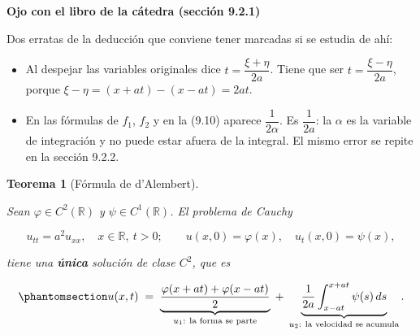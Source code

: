 \documentclass[
  spanish,
  a4paper,
]{scrbook}
\providecommand{\tightlist}{%
  \setlength{\itemsep}{0pt}\setlength{\parskip}{0pt}}
\theoremstyle{definition}
\theoremstyle{plain}
\theoremstyle{definition}
\theoremstyle{plain}
\newtheorem{theorem}{Teorema}[chapter]
\theoremstyle{definition}
\theoremstyle{remark}
\begin{document}
\begin{tcolorbox}[enhanced jigsaw, arc=.35mm, bottomrule=.15mm, breakable, colback=white, colframe=quarto-callout-warning-color-frame, left=2mm, leftrule=.75mm, opacityback=0, rightrule=.15mm, toprule=.15mm]
\begin{minipage}[t]{5.5mm}
\textcolor{quarto-callout-warning-color}{\faExclamationTriangle}
\end{minipage}%
\begin{minipage}[t]{\textwidth - 5.5mm}

\vspace{-3mm}\textbf{Ojo con el libro de la cátedra (sección 9.2.1)}\vspace{3mm}

Dos erratas de la deducción que conviene tener marcadas si se estudia de
ahí:

\begin{itemize}
\tightlist
\item
  Al despejar las variables originales dice
  \(t = \dfrac{\xi+\eta}{2a}\). Tiene que ser
  \(t = \dfrac{\xi-\eta}{2a}\), porque
  \(\xi - \eta = (x+at)-(x-at) = 2at\).
\item
  En las fórmulas de \(f_1\), \(f_2\) y en la (9.10) aparece
  \(\dfrac{1}{2\alpha}\). Es \(\dfrac{1}{2a}\): la \(\alpha\) es la
  variable de integración y no puede estar afuera de la integral. El
  mismo error se repite en la sección 9.2.2.
\end{itemize}

\end{minipage}%
\end{tcolorbox}

\begin{theorem}[Fórmula de
d'Alembert]\protect\hypertarget{thm-hip-dalembert}{}\label{thm-hip-dalembert}

Sean \(\varphi\in C^2(\mathbb R)\) y \(\psi\in C^1(\mathbb R)\). El
problema de Cauchy

\[
u_{tt} = a^2u_{xx},\quad x\in\mathbb R,\ t>0;\qquad u(x,0) = \varphi(x),\quad u_t(x,0) = \psi(x),
\]

tiene una \textbf{única} solución de clase \(C^2\), que es

\begin{equation}\protect\phantomsection\label{eq-hip-dalembert}{
u(x,t) \;=\; \underbrace{\frac{\varphi(x+at)+\varphi(x-at)}{2}}_{u_1:\ \text{la forma se parte}}
\;+\; \underbrace{\frac{1}{2a}\int_{x-at}^{x+at}\psi(s)\,ds}_{u_2:\ \text{la velocidad se acumula}} .
}\end{equation}

\end{theorem}
\end{document}
